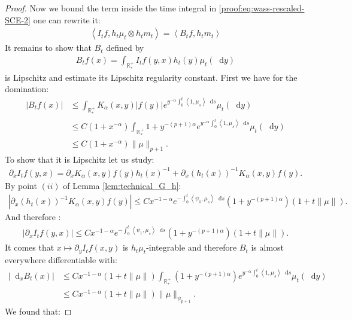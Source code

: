 \documentclass[11pt,a4paper]{article}
\newcommand{\RRP}{\mathbb{R}^+_*}
\newcommand{\brac}[1]{\left\langle#1\right\rangle}
\newcommand{\dd}{\mathop{}\!\mathrm{d}}
\begin{document}
\begin{proof}
    Now we bound the term inside the time integral in \eqref{proof:eq:wass-rescaled-SCE-2} one can rewrite it:
    \begin{align*}
        \brac{I_tf,h_t\mu_t \otimes h_t m_t} = \brac{B_tf,h_tm_t}
    \end{align*}
    It remains to show that $B_t$ defined by
    \begin{align*}
        B_tf(x) = \int_{\RRP} I_tf(y,x) h_t(y) \mu_t(\dd y)
    \end{align*}
    is Lipschitz and estimate its Lipschitz regularity constant. First we have for the domination:
    \begin{align*}
        \left|B_tf(x) \right| 
        &\leq \int_{\RRP} K_\alpha(x,y)\left|f(y) \right| e^{ y^{-\alpha} \int_0^t \brac{1,\mu_s} \dd s} \mu_t(\dd y) \\
        &\leq C(1 + x^{-\alpha})\int_{\RRP} 1 + y^{-(p+1)\alpha} e^{y^{-\alpha}\int_0^t \brac{1,\mu_s} \dd s} \mu_t(\dd y) \\
        &\leq C(1 + x^{-\alpha}) \|\mu\|_{p+1}.
    \end{align*}
    To show that it is Lipschitz let us study:
    \begin{align*}
        \partial_x I_tf(y,x) = \partial_x K_\alpha(x,y)f(y)h_t(x)^{-1} + \partial_x \left(h_t(x)\right)^{-1} K_\alpha(x,y)f(y).
    \end{align*}
    By point $(ii)$ of Lemma \ref{lem:technical_G_h}:
    \begin{align*}
        \left| \partial_x \left(h_t(x)\right)^{-1} K_\alpha(x,y)f(y)\right| \leq  C x^{-1-\alpha} e^{-\int_0^t \brac{\psi_1,\mu_s}\dd s}(1 + y^{-(p+1)\alpha}) (1 + t\|\mu\|).
    \end{align*}
    And therefore :
    \begin{align*}
        \left| \partial_x I_tf(y,x)\right| \leq C x^{-1-\alpha} e^{-\int_0^t \brac{\psi_1,\mu_s}\dd s} (1 + y^{-(p+1) \alpha}) (1 + t\|\mu\|).
    \end{align*}
    It comes that $x \mapsto \partial_y I_tf(x,y)$ is $h_t\mu_t$-integrable and therefore $B_t$ is almost everywhere differentiable with:
    \begin{align*}
        \left| \dd_x B_t(x)\right| 
        &\leq C x^{-1-\alpha} (1 + t\|\mu\|) \int_{\RRP} (1 + y^{-(p+1) \alpha}) e^{y^{-\alpha}\int_0^t \brac{1,\mu_s} \dd s} \mu_t(\dd y) \\
        &\leq C x^{-1-\alpha} (1 + t\|\mu\|) \|\mu\|_{\psi_{p+1}}.
    \end{align*}
    We found that:

\end{proof}
\end{document}
